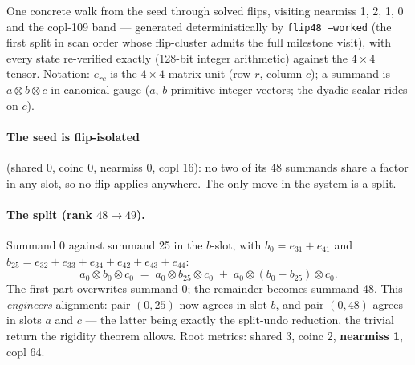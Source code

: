 \documentclass[10pt]{article}
\begin{document}
One concrete walk from the seed through solved flips, visiting
nearmiss 1, 2, 1, 0 and the copl-109 band --- generated
deterministically by \texttt{flip48 --worked} (the first split in
scan order whose flip-cluster admits the full milestone visit), with
every state re-verified exactly (128-bit integer arithmetic) against
the $4{\times}4$ tensor. Notation: $e_{rc}$ is the $4\times4$ matrix
unit (row $r$, column $c$); a summand is $a \otimes b \otimes c$ in
canonical gauge ($a$, $b$ primitive integer vectors; the dyadic
scalar rides on $c$).

\paragraph{The seed is flip-isolated} (shared 0, coinc 0, nearmiss 0,
copl 16): no two of its 48 summands share a factor in any slot, so no
flip applies anywhere. The only move in the system is a split.

\paragraph{The split (rank $48 \to 49$).} Summand 0 against summand
25 in the $b$-slot, with $b_0 = e_{31} + e_{41}$ and
$b_{25} = e_{32} + e_{33} + e_{34} + e_{42} + e_{43} + e_{44}$:
\[
a_0 \otimes b_0 \otimes c_0
  \;=\; a_0 \otimes b_{25} \otimes c_0
  \;+\; a_0 \otimes (b_0 - b_{25}) \otimes c_0 .
\]
The first part overwrites summand 0; the remainder becomes summand
48. This \emph{engineers} alignment: pair $(0, 25)$ now agrees in
slot $b$, and pair $(0, 48)$ agrees in slots $a$ and $c$ --- the
latter being exactly the split-undo reduction, the trivial return the
rigidity theorem allows. Root metrics: shared 3, coinc 2,
\textbf{nearmiss 1}, copl 64.
\end{document}
